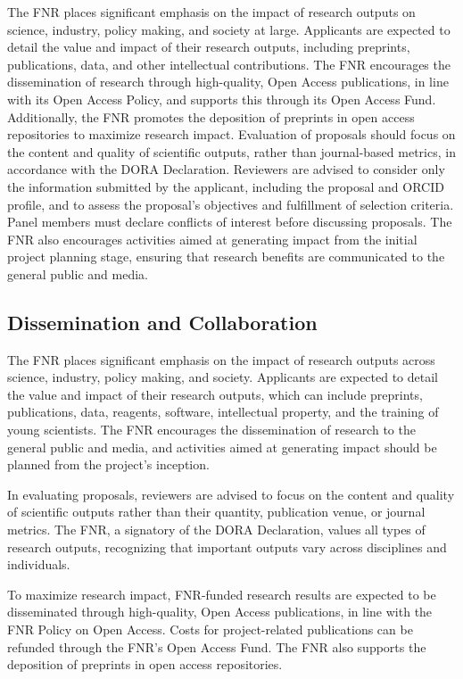 \documentclass{article}
\begin{document}
The FNR places significant emphasis on the impact of research outputs on science, industry, policy making, and society at large. Applicants are expected to detail the value and impact of their research outputs, including preprints, publications, data, and other intellectual contributions. The FNR encourages the dissemination of research through high-quality, Open Access publications, in line with its Open Access Policy, and supports this through its Open Access Fund. Additionally, the FNR promotes the deposition of preprints in open access repositories to maximize research impact. Evaluation of proposals should focus on the content and quality of scientific outputs, rather than journal-based metrics, in accordance with the DORA Declaration. Reviewers are advised to consider only the information submitted by the applicant, including the proposal and ORCID profile, and to assess the proposal's objectives and fulfillment of selection criteria. Panel members must declare conflicts of interest before discussing proposals. The FNR also encourages activities aimed at generating impact from the initial project planning stage, ensuring that research benefits are communicated to the general public and media.

\subsection{Dissemination and Collaboration}

The FNR places significant emphasis on the impact of research outputs across science, industry, policy making, and society. Applicants are expected to detail the value and impact of their research outputs, which can include preprints, publications, data, reagents, software, intellectual property, and the training of young scientists. The FNR encourages the dissemination of research to the general public and media, and activities aimed at generating impact should be planned from the project's inception.

In evaluating proposals, reviewers are advised to focus on the content and quality of scientific outputs rather than their quantity, publication venue, or journal metrics. The FNR, a signatory of the DORA Declaration, values all types of research outputs, recognizing that important outputs vary across disciplines and individuals.

To maximize research impact, FNR-funded research results are expected to be disseminated through high-quality, Open Access publications, in line with the FNR Policy on Open Access. Costs for project-related publications can be refunded through the FNR’s Open Access Fund. The FNR also supports the deposition of preprints in open access repositories.
\end{document}
